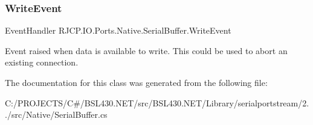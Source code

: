 \subsubsection{\texorpdfstring{WriteEvent}{WriteEvent}}
{\footnotesize\ttfamily Event\+Handler R\+J\+C\+P.\+I\+O.\+Ports.\+Native.\+Serial\+Buffer.\+Write\+Event}



Event raised when data is available to write. This could be used to abort an existing connection. 



The documentation for this class was generated from the following file\+:\begin{DoxyCompactItemize}
\item 
C\+:/\+P\+R\+O\+J\+E\+C\+T\+S/\+C\#/\+B\+S\+L430.\+N\+E\+T/src/\+B\+S\+L430.\+N\+E\+T/\+Library/serialportstream/2../src/\+Native/Serial\+Buffer.\+cs\end{DoxyCompactItemize}
